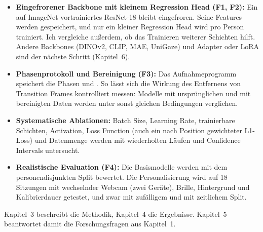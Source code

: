 \begin{itemize}
  \item \textbf{Eingefrorener Backbone mit kleinem Regression Head (F1, F2):}
        Ein auf ImageNet vortrainiertes ResNet-18 bleibt eingefroren. Seine
        Features werden gespeichert, und nur ein kleiner Regression Head wird pro
        Person trainiert. Ich vergleiche außerdem, ob das Trainieren weiterer
        Schichten hilft. Andere Backbones (DINOv2, CLIP, MAE, UniGaze) und
        Adapter oder LoRA sind der nächste Schritt (Kapitel~6).
  \item \textbf{Phasenprotokoll und Bereinigung (F3):} Das Aufnahmeprogramm
        speichert die Phasen  und . So lässt sich die
        Wirkung des Entfernens von Transition Frames kontrolliert messen:
        Modelle mit ursprünglichen und mit bereinigten Daten werden unter sonst
        gleichen Bedingungen verglichen.
  \item \textbf{Systematische Ablationen:} Batch Size, Learning Rate, trainierbare
        Schichten, Activation, Loss Function (auch ein nach Position
        gewichteter L1-Loss) und Datenmenge werden mit wiederholten Läufen
        und Confidence Intervals untersucht.
  \item \textbf{Realistische Evaluation (F4):} Die Basismodelle werden mit dem
        personendisjunkten Split  bewertet. Die
        Personalisierung wird auf 18 Sitzungen mit wechselnder Webcam (zwei Geräte),
        Brille, Hintergrund und Kalibrierdauer getestet, und zwar mit
        zufälligem und mit zeitlichem Split.
\end{itemize}

Kapitel~3 beschreibt die Methodik, Kapitel~4 die Ergebnisse. Kapitel~5
beantwortet damit die Forschungsfragen aus Kapitel~1.

